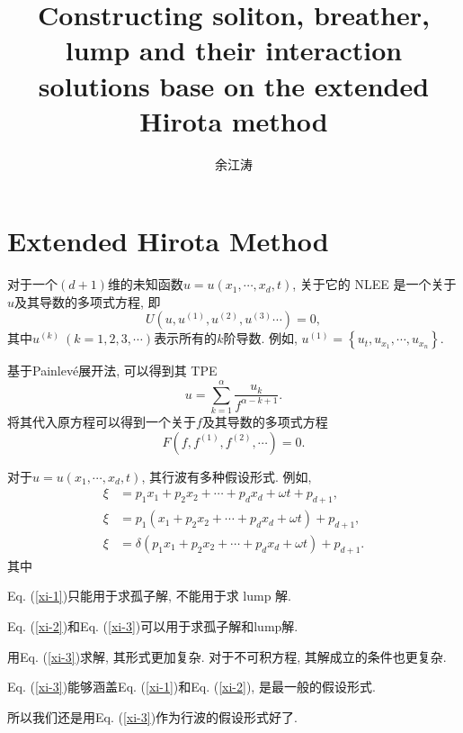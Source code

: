 \documentclass{article}
\newcommand{\sbrace}[1]{\left(#1\right)}
\newcommand{\bbrace}[1]{\left\{#1\right\}}
\newcommand{\up}[1]{^{(#1)}}
\newcommand{\Painleve}{Painlev{\'e}}
\newcommand{\refeqn}[1]{Eq. (\ref{#1})}
\begin{document}
\title{Constructing soliton, breather, lump and their interaction solutions base on the extended Hirota method}
\author{余江涛}
\maketitle

\section{Extended Hirota Method}

对于一个$(d+1)$维的未知函数$u=u(x_1,\cdots,x_d,t)$, 关于它的 NLEE 是一个关于$u$及其导数的多项式方程, 即
\begin{equation}
    U(u,u\up{1},u\up{2},u\up{3}\cdots)=0, \label{oeq}
\end{equation}
其中$u\up{k}~(k=1,2,3,\cdots)$表示所有的$k$阶导数. 例如, $u\up{1}=\bbrace{u_t,u_{x_1},\cdots,u_{x_n}}$.

基于\Painleve{}展开法, 可以得到其 TPE
\begin{equation}
u=\sum_{k=1}^{\alpha}{\frac{u_k}{f^{\alpha-k+1}}}. 
\end{equation}
将其代入原方程可以得到一个关于$f$及其导数的多项式方程 
\begin{equation}
F\sbrace{f,f\up{1},f\up{2},\cdots}=0.
\end{equation}

对于$u=u\sbrace{x_1,\cdots,x_d,t}$, 其行波有多种假设形式. 例如, 
\begin{subequations}
\begin{align}
\xi&=p_1 x_1 + p_2 x_2 + \cdots + p_d x_d + \omega t+p_{d+1},  \label{xi-1}\\ 
\xi&=p_1 (x_1 + p_2 x_2 + \cdots + p_d x_d + \omega t)+p_{d+1}, \label{xi-2}\\ 
\xi&=\delta \sbrace{p_1 x_1 + p_2 x_2 + \cdots + p_d x_d + \omega t}+p_{d+1} \label{xi-3}. 
\end{align}
\end{subequations}
其中
\begin{compactitem}[\textbullet]
\item \refeqn{xi-1}只能用于求孤子解, 不能用于求 lump 解.
\item \refeqn{xi-2}和\refeqn{xi-3}可以用于求孤子解和lump解. 
\item 用\refeqn{xi-3}求解, 其形式更加复杂. 对于不可积方程, 其解成立的条件也更复杂.
\item \refeqn{xi-3}能够涵盖\refeqn{xi-1}和\refeqn{xi-2}, 是最一般的假设形式.
\end{compactitem}
所以我们还是用\refeqn{xi-3}作为行波的假设形式好了.
\end{document}
